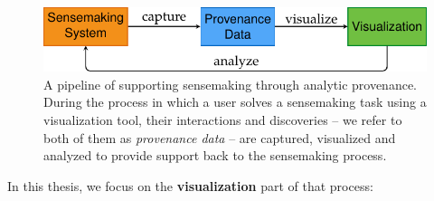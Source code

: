 
\begin{figure}[!htb]
	\centering
	\includegraphics{workflow}
	\caption{A pipeline of supporting sensemaking through analytic provenance. During the process in which a user solves a sensemaking task using a visualization tool, their interactions and discoveries -- we refer to both of them as \emph{provenance data} -- are captured, visualized and analyzed to provide support back to the sensemaking process.}
	\label{fig:workflow}
\end{figure}


In this thesis, we focus on the \textbf{visualization} part of that process:
\begin{center}
\end{center}

